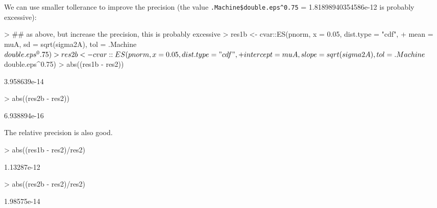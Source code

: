 \documentclass[nojss,article]{jss}
\begin{document}
We can use smaller tollerance to improve the precision
(the value \verb+.Machine$double.eps^0.75+ = 1.81898940354586e-12 is probably excessive):
\begin{Schunk}
\begin{Sinput}
> ## as above, but increase the precision, this is probably excessive
> res1b <- cvar::ES(pnorm, x = 0.05, dist.type = "cdf",
+                    mean = muA, sd = sqrt(sigma2A), tol = .Machine$double.eps^0.75)
> res2b <- cvar::ES(pnorm, x = 0.05, dist.type = "cdf",
+                    intercept = muA, slope = sqrt(sigma2A), tol = .Machine$double.eps^0.75)
> abs((res1b - res2))
\end{Sinput}
\begin{Soutput}
[1] 3.958639e-14
\end{Soutput}
\begin{Sinput}
> abs((res2b - res2))
\end{Sinput}
\begin{Soutput}
[1] 6.938894e-16
\end{Soutput}
\end{Schunk}

The relative precision is also good.
\begin{Schunk}
\begin{Sinput}
> abs((res1b - res2)/res2)
\end{Sinput}
\begin{Soutput}
[1] 1.13287e-12
\end{Soutput}
\begin{Sinput}
> abs((res2b - res2)/res2)
\end{Sinput}
\begin{Soutput}
[1] 1.98575e-14
\end{Soutput}
\end{Schunk}
\end{document}
